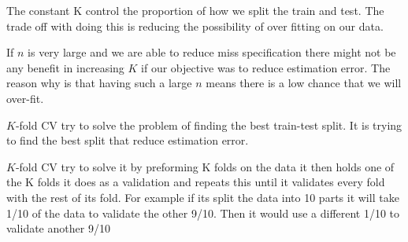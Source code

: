 \documentclass[12pt]{article}
\begin{document}

\begin{enumerate}


The constant K control the proportion of how we split the train and test. The trade off with doing this is reducing the possibility of over fitting on our data.   


If $n$ is very large and we are able to reduce miss specification there might not be any benefit in increasing $K$ if our objective was to reduce estimation error. The reason why is that having such a large $n$ means there is a low chance that we will over-fit. 


$K$-fold CV try to solve the problem of finding the best train-test split. It is trying to find the best split that reduce estimation error. 


 $K$-fold CV try to solve it by preforming K folds on the data it then holds one of the K folds it does as a validation and repeats this until it validates every fold with the rest of its fold. For example if its split the data into 10 parts it will take 1/10 of the data to validate the other 9/10. Then it would use a different 1/10 to validate another 9/10


\end{enumerate}

\end{document}
